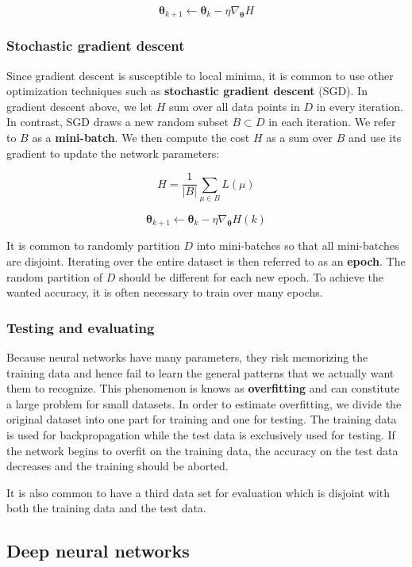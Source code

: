 \[
\mathbf{\theta}_{k+1} \leftarrow
\mathbf{\theta}_k - \eta \nabla_{\mathbf{\theta}} H
\]

\subsubsection{Stochastic gradient descent}

Since gradient descent is susceptible to local minima, it is common to use other optimization techniques such as \textbf{stochastic gradient descent} (SGD).
In gradient descent above, we let $H$ sum over all data points in $D$ in every iteration. In contrast, SGD draws a new random subset $B \subset D$ in each iteration. We refer to $B$ as a \textbf{mini-batch}. We then compute the cost $H$ as a sum over $B$ and use its gradient to update the network parameters:

\[
H = \frac{1}{\vert B \vert} \sum_{\mu \in B} L(\mu)
\]

\[
\mathbf{\theta}_{k+1} \leftarrow
\mathbf{\theta}_k - \eta \nabla_{\mathbf{\theta}} H(k)
\]

It is common to randomly partition $D$ into mini-batches so that all mini-batches are disjoint. Iterating over the entire dataset is then referred to as an \textbf{epoch}.
The random partition of $D$ should be different for each new epoch.
To achieve the wanted accuracy, it is often necessary to train over many epochs.


\subsubsection{Testing and evaluating}

Because neural networks have many parameters, they risk memorizing the training data and hence fail to learn the general patterns that we actually want them to recognize.
This phenomenon is knows as \textbf{overfitting} and can constitute a large problem for small datasets. In order to estimate overfitting, we divide the original dataset into one part for training and one for testing. The training data is used for backpropagation while the test data is exclusively used for testing. If the network begins to overfit on the training data, the accuracy on the test data decreases and the training should be aborted.

It is also common to have a third data set for evaluation which is disjoint with both the training data and the test data.


\subsection{Deep neural networks}

